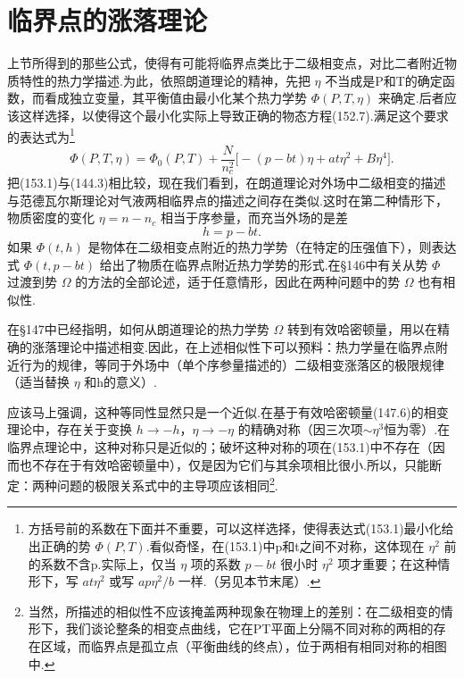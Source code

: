 \section{临界点的涨落理论}

上节所得到的那些公式，使得有可能将临界点类比于二级相变点，对比二者附近物质特性的热力学描述.为此，依照朗道理论的精神，先把 $\eta$ 不当成是P和T的确定函数，而看成独立变量，其平衡值由最小化某个热力学势 $\Phi(P,T,\eta)$ 来确定.后者应该这样选择，以使得这个最小化实际上导致正确的物态方程(152.7).满足这个要求的表达式为\footnote{方括号前的系数在下面并不重要，可以这样选择，使得表达式(153.1)最小化给出正确的势 $\Phi(P,T)$.看似奇怪，在(153.1)中p和t之间不对称，这体现在 $\eta^2$ 前的系数不含p.实际上，仅当 $\eta$ 项的系数 $p-bt$ 很小时 $\eta^2$ 项才重要；在这种情形下，写 $at\eta^2$ 或写 $ap\eta^2/b$ 一样.（另见本节末尾）.}
\begin{equation}
  \Phi(P,T,\eta)=\Phi_0(P,T)
  +\frac{N}{n_c^2}\bigl[-(p-bt)\eta+at\eta^2+B\eta^4\bigr].
\end{equation}
把(153.1)与(144.3)相比较，现在我们看到，在朗道理论对外场中二级相变的描述与范德瓦尔斯理论对气液两相临界点的描述之间存在类似.这时在第二种情形下，物质密度的变化 $\eta=n-n_c$ 相当于序参量，而充当外场的是差
\begin{equation}
  h=p-bt.
\end{equation}
如果 $\Phi(t,h)$ 是物体在二级相变点附近的热力学势（在特定的压强值下），则表达式 $\Phi(t,p-bt)$ 给出了物质在临界点附近热力学势的形式.在§146中有关从势 $\Phi$ 过渡到势 $\Omega$ 的方法的全部论述，适于任意情形，因此在两种问题中的势 $\Omega$ 也有相似性.

在§147中已经指明，如何从朗道理论的热力学势 $\Omega$ 转到有效哈密顿量，用以在精确的涨落理论中描述相变.因此，在上述相似性下可以预料：热力学量在临界点附近行为的规律，等同于外场中（单个序参量描述的）二级相变涨落区的极限规律（适当替换 $\eta$ 和h的意义）.

应该马上强调，这种等同性显然只是一个近似.在基于有效哈密顿量(147.6)的相变理论中，存在关于变换 $h\to-h$，$\eta\to-\eta$ 的精确对称（因三次项$\sim\eta^3$恒为零）.在临界点理论中，这种对称只是近似的；破坏这种对称的项在(153.1)中不存在（因而也不存在于有效哈密顿量中），仅是因为它们与其余项相比很小.所以，只能断定：两种问题的极限关系式中的主导项应该相同\footnote{当然，所描述的相似性不应该掩盖两种现象在物理上的差别：在二级相变的情形下，我们谈论整条的相变点曲线，它在PT平面上分隔不同对称的两相的存在区域，而临界点是孤立点（平衡曲线的终点），位于两相有相同对称的相图中.}.

